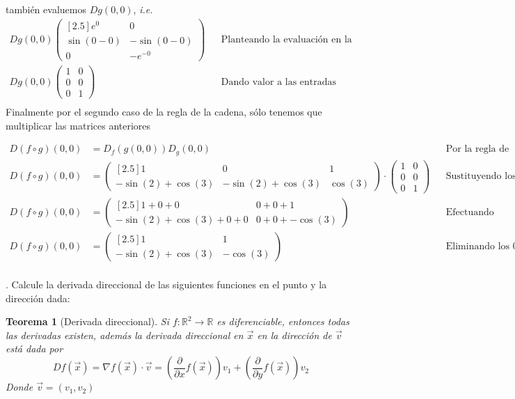 \documentclass[letterpaper]{article}
\renewcommand{\d}{\partial}
\newcommand{\R}{\mathds{R}}
\renewcommand{\*}{\cdot}
\newtheorem{theorem}{Teorema}[]
\theoremstyle{definition}
\begin{document}
también evaluemos $ Dg(0,0) $, \textit{i.e. }
\begin{align*}
	Dg(0,0)\begin{pmatrix}[2.5]
	e^0 & 0\\
	\sin{(0 - 0)}  & -\sin{(0 - 0)}\\
	0 & -e^{-0}
	\end{pmatrix}&&\text{Planteando la evaluación en la matriz de derivadas}\\
	Dg(0,0)\begin{pmatrix}
	1 & 0\\
	0 & 0\\
	0 & 1
	\end{pmatrix}&&\text{Dando valor a las entradas}\\
\end{align*}
Finalmente por el segundo caso de la regla de la cadena, sólo tenemos que multiplicar las matrices anteriores

\begin{align*}
	 D(f \circ g)(0,0) &= D_f(g(0,0))D_g(0,0) && \text{Por la regla de la cadena}\\
	 D(f \circ g)(0,0) &= \begin{pmatrix}[2.5]
	 1 & 0& 1 \\
	 -\sin(2) + \cos(3) & -\sin(2) + \cos(3) & \cos(3)
	 \end{pmatrix}\*\begin{pmatrix}
	 1 & 0\\
	 0 & 0\\
	 0 & 1
	 \end{pmatrix} && \text{Sustituyendo los valores correspondientes}\\
	 D(f \circ g)(0,0) &= \begin{pmatrix}[2.5]
	 1 + 0 + 0 & 0 + 0 + 1 \\
	 -\sin(2) + \cos(3) +0 +0 &  0 + 0 + -\cos(3)
	 \end{pmatrix} && \text{Efectuando multiplicación de matrices }\\
	 D(f \circ g)(0,0) &= \begin{pmatrix}[2.5]
	 1 & 1 \\
	 -\sin(2) + \cos(3)& -\cos(3)
	 \end{pmatrix} && \text{Eliminando los  }0\\
\end{align*}

.  Calcule la derivada direccional de las siguientes funciones en el punto y la dirección dada: \\
\begin{theorem}[Derivada direccional]
	Si $ f:\R^2 \to \R $ es diferenciable, entonces todas las derivadas existen, además la derivada direccional en $ \vec{x} $ en la dirección de $ \vec{v} $ está dada por
	\[ Df(\vec{x}) = \nabla f(\vec{x}) \* \vec{v} = \left( \dfrac{\d}{\d x} f(\vec{x}) \right) v_1 +  \left( \dfrac{\d}{\d y} f(\vec{x}) \right) v_2 \]
	Donde $ \vec{v} = (v_1, v_2) $
\end{theorem}
\end{document}
